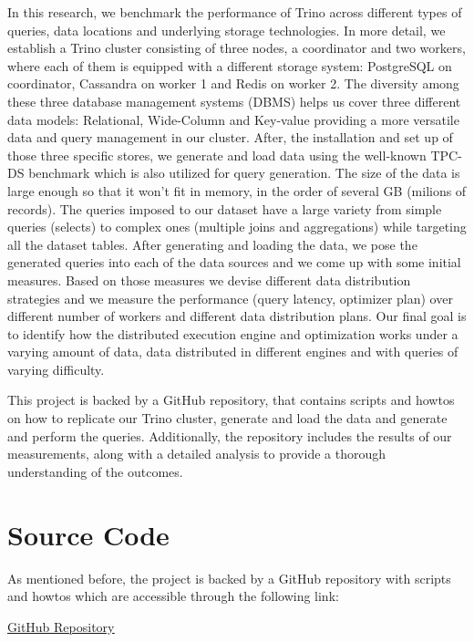 \documentclass[conference]{IEEEtran}
\begin{document}
In this research, we benchmark the performance of Trino across different types of queries, data locations and underlying
storage technologies. In more detail, we establish a Trino cluster consisting of three nodes, a coordinator and two workers,
where each of them is equipped with a different storage system: PostgreSQL on coordinator, Cassandra on worker 1 and Redis on worker 2. 
The diversity among these three database management systems (DBMS) helps us cover three different data models: 
Relational, Wide-Column and Key-value providing a more versatile data and query management in our cluster. After, the installation and set up of those three specific stores, we generate and load
data using the well-known TPC-DS \cite{b1} benchmark which is also utilized for query generation.
The size of the data is large enough so that it won't fit in memory, in the order of several GB (milions of records). 
The queries imposed to our dataset have a large variety from simple queries (selects) to complex ones (multiple joins and aggregations) while targeting all the dataset tables.
After generating and loading the data, we pose the generated queries into each of the data sources and we come up with some
initial measures. Based on those measures we devise different data distribution strategies and we measure the performance
(query latency, optimizer plan) over different number of workers and different data distribution plans. Our final goal is to
identify how the distributed execution engine and optimization works under a varying amount of data, data distributed in
different engines and with queries of varying difficulty. 

This project is backed by a GitHub repository, that contains scripts and howtos on how to replicate our Trino cluster, generate and load the data and 
generate and perform the queries. Additionally, the repository includes the results of our measurements, along with a detailed analysis to provide a 
thorough understanding of the outcomes.



\section{Source Code}
As mentioned before, the project is backed by a GitHub repository with scripts and howtos which are accessible
through the following link:

\begin{center}
\textcolor{linkblue}{\underline{\href{https://github.com/alex1on/Information-Systems-NTUA}{GitHub Repository}}}
\end{center}
\end{document}

